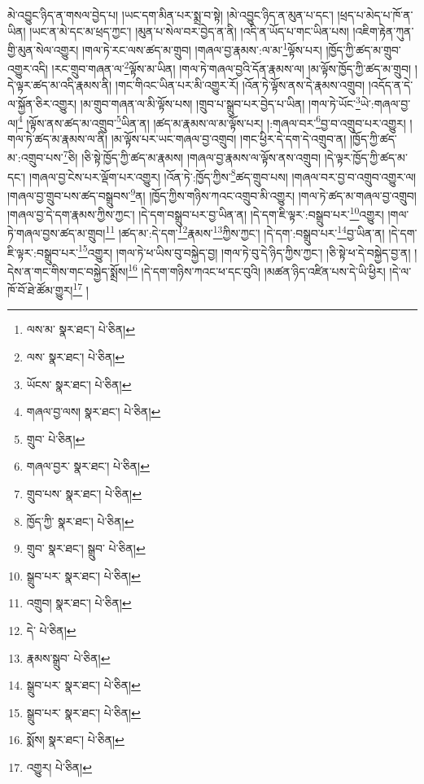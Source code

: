 མེ་འབྱུང་ཉིད་ན་གསལ་བྱེད་པ། །ཡང་དག་མིན་པར་སྨྲ་བ་སྟེ། །མེ་འབྱུང་ཉིད་ན་མུན་པ་དང་། །ཕྲད་པ་མེད་པ་ཁོ་ན་ཡིན། །ཡང་ན་མེ་དང་མ་ཕྲད་ཀྱང་། །མུན་པ་སེལ་བར་བྱེད་ན་ནི། །འདི་ན་ཡོད་པ་གང་ཡིན་པས། །འཇིག་རྟེན་ཀུན་གྱི་མུན་སེལ་འགྱུར། །གལ་ཏེ་རང་ལས་ཚད་མ་གྲུབ། །གཞལ་བྱ་རྣམས་:ལ་མ་\footnote{ལས་མ་  སྣར་ཐང་།  པེ་ཅིན། }ལྟོས་པར། །ཁྱོད་ཀྱི་ཚད་མ་གྲུབ་འགྱུར་འདི། །རང་གྲུབ་གཞན་ལ་\footnote{ལས་  སྣར་ཐང་།  པེ་ཅིན། }ལྟོས་མ་ཡིན། །གལ་ཏེ་གཞལ་བྱའི་དོན་རྣམས་ལ། །མ་ལྟོས་ཁྱོད་ཀྱི་ཚད་མ་གྲུབ། །དེ་ལྟར་ཚད་མ་འདི་རྣམས་ནི། །གང་གིའང་ཡིན་པར་མི་འགྱུར་རོ། །འོན་ཏེ་ལྟོས་ནས་དེ་རྣམས་འགྲུབ། །འདོད་ན་དེ་ལ་སྐྱོན་ཅིར་འགྱུར། །མ་གྲུབ་གཞན་ལ་མི་ལྟོས་པས། །གྲུབ་པ་སྒྲུབ་པར་བྱེད་པ་ཡིན། །གལ་ཏེ་ཡོང་\footnote{ཡོངས་  སྣར་ཐང་།  པེ་ཅིན། }ཡེ་:གཞལ་བྱ་ལ།\footnote{གཞལ་བྱ་ལས།  སྣར་ཐང་།  པེ་ཅིན། } །ལྟོས་ནས་ཚད་མ་འགྲུབ་\footnote{གྲུབ་  པེ་ཅིན། }ཡིན་ན། །ཚད་མ་རྣམས་ལ་མ་ལྟོས་པར། །:གཞལ་བར་\footnote{གཞལ་བྱར་  སྣར་ཐང་།  པེ་ཅིན། }བྱ་བ་འགྲུབ་པར་འགྱུར། །གལ་ཏེ་ཚད་མ་རྣམས་ལ་ནི། །མ་ལྟོས་པར་ཡང་གཞལ་བྱ་འགྲུབ། །གང་ཕྱིར་དེ་དག་དེ་འགྲུབ་ན། །ཁྱོད་ཀྱི་ཚད་མ་:འགྲུབ་པས་\footnote{གྲུབ་པས་  སྣར་ཐང་།  པེ་ཅིན། }ཅི། །ཅི་སྟེ་ཁྱོད་ཀྱི་ཚད་མ་རྣམས། །གཞལ་བྱ་རྣམས་ལ་ལྟོས་ནས་འགྲུབ། །དེ་ལྟར་ཁྱོད་ཀྱི་ཚད་མ་དང་། །གཞལ་བྱ་ངེས་པར་ལྡོག་པར་འགྱུར། །འོན་ཏེ་:ཁྱོད་ཀྱིས་\footnote{ཁྱོད་ཀྱི་  སྣར་ཐང་།  པེ་ཅིན། }ཚད་གྲུབ་པས། །གཞལ་བར་བྱ་བ་འགྲུབ་འགྱུར་ལ། །གཞལ་བྱ་གྲུབ་པས་ཚད་བསྒྲུབས་\footnote{གྲུབ་  སྣར་ཐང་། སྒྲུབ་  པེ་ཅིན། }ན། །ཁྱོད་ཀྱིས་གཉིས་ཀའང་འགྲུབ་མི་འགྱུར། །གལ་ཏེ་ཚད་མ་གཞལ་བྱ་འགྲུབ། །གཞལ་བྱ་དེ་དག་རྣམས་ཀྱིས་ཀྱང་། །དེ་དག་བསྒྲུབ་པར་བྱ་ཡིན་ན། །དེ་དག་ཇི་ལྟར་:བསྒྲུབ་པར་\footnote{སྒྲུབ་པར་  སྣར་ཐང་།  པེ་ཅིན། }འགྱུར། །གལ་ཏེ་གཞལ་བྱས་ཚད་མ་གྲུབ།\footnote{འགྲུབ།  སྣར་ཐང་།  པེ་ཅིན། } །ཚད་མ་:དེ་དག་\footnote{དེ་  པེ་ཅིན། }རྣམས་\footnote{རྣམས་སྒྲུབ་  པེ་ཅིན། }ཀྱིས་ཀྱང་། །དེ་དག་:བསྒྲུབ་པར་\footnote{སྒྲུབ་པར་  སྣར་ཐང་།  པེ་ཅིན། }བྱ་ཡིན་ན། །དེ་དག་ཇི་ལྟར་:བསྒྲུབ་པར་\footnote{སྒྲུབ་པར་  སྣར་ཐང་།  པེ་ཅིན། }འགྱུར། །གལ་ཏེ་ཕ་ཡིས་བུ་བསྐྱེད་བྱ། །གལ་ཏེ་བུ་དེ་ཉིད་ཀྱིས་ཀྱང་། །ཅི་སྟེ་ཕ་དེ་བསྐྱེད་བྱ་ན། །དེས་ན་གང་གིས་གང་བསྐྱེད་སྨྲོས།\footnote{སྨོས།  སྣར་ཐང་།  པེ་ཅིན། } །དེ་དག་གཉིས་ཀའང་ཕ་དང་བུའི། །མཚན་ཉིད་འཛིན་པས་དེ་ཡི་ཕྱིར། །དེ་ལ་ཁོ་བོ་ཐེ་ཚོམ་གྱུར།\footnote{འགྱུར།  པེ་ཅིན། } །
